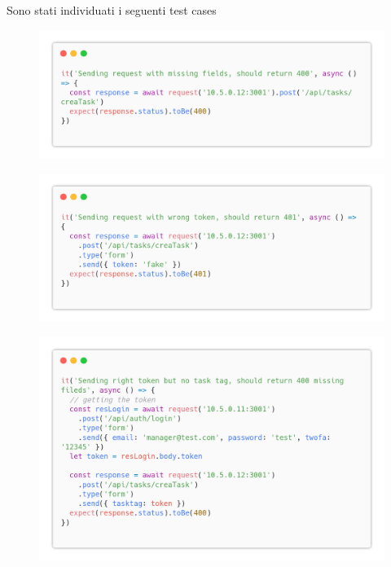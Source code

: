 \documentclass{report}
\begin{document}
Sono stati individuati i seguenti test cases
\begin{figure}[H]
	\centering\includegraphics[width=1\textwidth]{images/code_crea_task_test1.png}
\end{figure}
\begin{figure}[H]
	\centering\includegraphics[width=1\textwidth]{images/code_crea_task_test2.png}
\end{figure}
\begin{figure}[H]
	\centering\includegraphics[width=1\textwidth]{images/code_crea_task_test3.png}
\end{figure}
\end{document}
